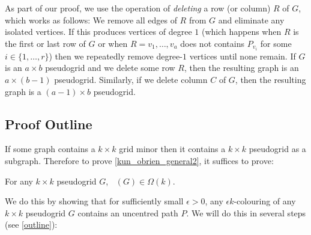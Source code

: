\documentclass{patmorin}
\newcommand{\defin}[1]{\emph{\color{brown}#1}}
\DeclareMathOperator{\chilin}{\chi_{\mathrm{lin}}}
\begin{document}
As part of our proof, we use the operation of \defin{deleting} a row (or column) $R$ of $G$, which works as follows:  We remove all edges of $R$ from $G$ and eliminate any isolated vertices.  If this produces vertices of degree $1$ (which happens when $R$ is the first or last row of $G$ or when $R=v_1,\ldots,v_a$ does not contains $P_{v_i}$ for some $i\in\{1,\ldots,r\}$) then we repeatedly remove degree-$1$ vertices until none remain.  If $G$ is an $a\times b$ pseudogrid and we delete some row $R$, then the resulting graph is an $a\times (b-1)$ pseudogrid.  Similarly, if we delete column $C$ of $G$, then the resulting graph is a $(a-1)\times b$ pseudogrid.

\subsection{Proof Outline}

If some graph contains a $k\times k$ grid minor then it contains a $k\times k$ pseudogrid as a subgraph.  Therefore to prove \cref{kun_obrien_general2}, it suffices to prove:

\begin{lem}\label{pseudogrid_lower_bound}
  For any $k\times k$ pseudogrid $G$, $\chilin(G)\in\Omega(k)$.
\end{lem}

We do this by showing that for sufficiently small $\epsilon >0$,  any $\epsilon k$-colouring of any $k\times k$ pseudogrid $G$ contains an uncentred path $P$. We will do this in several steps (see \cref{outline}):
\end{document}
